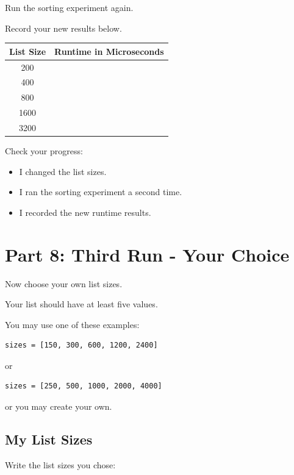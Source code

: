 \documentclass[11pt]{article}
\newcommand{\checkbox}{$\square$}
\begin{document}
Run the sorting experiment again.

Record your new results below.

\begin{center}
\begin{tabular}{|c|c|}
\hline
\textbf{List Size} & \textbf{Runtime in Microseconds} \\
\hline
200 & \\
\hline
400 & \\
\hline
800 & \\
\hline
1600 & \\
\hline
3200 & \\
\hline
\end{tabular}
\end{center}

\noindent Check your progress:

\begin{itemize}
    \item[\checkbox] I changed the list sizes.
    \item[\checkbox] I ran the sorting experiment a second time.
    \item[\checkbox] I recorded the new runtime results.
\end{itemize}

\section*{Part 8: Third Run - Your Choice}

Now choose your own list sizes.

Your list should have at least five values.

You may use one of these examples:

\begin{lstlisting}[style=pythonstyle]
sizes = [150, 300, 600, 1200, 2400]
\end{lstlisting}

or

\begin{lstlisting}[style=pythonstyle]
sizes = [250, 500, 1000, 2000, 4000]
\end{lstlisting}

or you may create your own.

\subsection*{My List Sizes}

Write the list sizes you chose:
\end{document}
